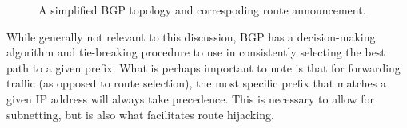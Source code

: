 \begin{figure}
\begin{centering}
\caption{A simplified BGP topology and correspoding route announcement.}
\label{fig:bgp_announcement}
\end{centering}
\end{figure}


While generally not relevant to this discussion, BGP has a decision-making algorithm and tie-breaking procedure to use in consistently selecting the best path to a given prefix. What is perhaps important to note is that for forwarding traffic (as opposed to route selection), the most specific prefix that matches a given IP address will always take precedence. This is necessary to allow for subnetting, but is also what facilitates route hijacking.

